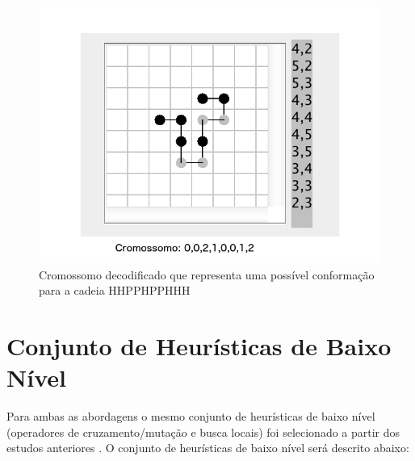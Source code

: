 \begin{figure}[!htb]
	\centering
	\includegraphics[scale=0.36]{Imagens/DecodedCromossome.png}
	\caption{Cromossomo decodificado que representa uma possível conformação para a cadeia HHPPHPPHHH}
	\label{img:cromossomo}
\end{figure}


\section{Conjunto de Heurísticas de Baixo Nível}
\label{section:llhset}
Para ambas as abordagens o mesmo conjunto de heurísticas de baixo nível (operadores de cruzamento/mutação e busca locais) foi selecionado a partir dos estudos anteriores \cite{custodio2014multiple, custodio2004investigation, garza2012locality,benitez2015algoritmo}. O conjunto de heurísticas de baixo nível será descrito abaixo:

